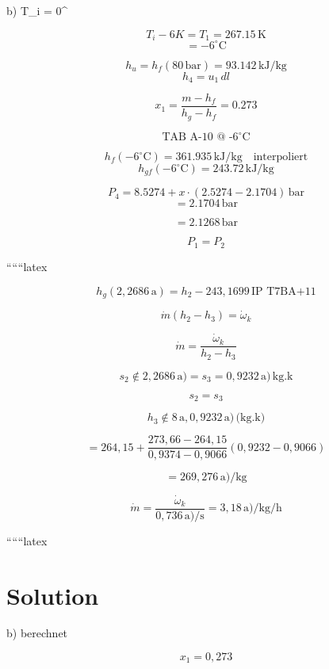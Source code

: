 b) \quad T_i = 0^\circ {}

\[
T_i - 6K = T_1 = 267.15 \, \text{K}
\]
\[
=-6^\circ \text{C}
\]

\[
h_u = h_f (80 \, \text{bar}) = 93.142 \, \text{kJ/kg}
\]
\[
h_4 = u_1 \, dl
\]

\[
x_1 = \frac{m - h_f}{h_g - h_f} = 0.273
\]

\[
\text{TAB A-10 @ -6}^\circ \text{C}
\]

\[
h_f (-6^\circ \text{C}) = 361.935 \, \text{kJ/kg} \quad \text{interpoliert}
\]
\[
h_{gf} (-6^\circ \text{C}) = 243.72 \, \text{kJ/kg}
\]

\[
P_4 = 8.5274 + x \cdot (2.5274 - 2.1704) \, \text{bar}
\]
\[
= 2.1704 \, \text{bar}
\]

\[
= 2.1268 \, \text{bar}
\]

\[
P_1 = P_2
\]

``````latex

\[
h_g(2,2686 \, \text{a}) = h_2 - 243,1699 \, \text{IP T7BA+11}
\]

\[
\dot{m}(h_2 - h_3) = \dot{\omega}_k
\]

\[
\dot{m} = \frac{\dot{\omega}_k}{h_2 - h_3}
\]

\[
s_2 \not\in 2,2686 \, \text{a}) = s_3 = 0,9232 \, \text{a}) \, \text{kg.k}
\]

\[
s_2 = s_3
\]

\[
h_3 \not\in 8 \, \text{a}, 0,9232 \, \text{a}) \, \text{(kg.k)}
\]

\[
= 264,15 + \frac{273,66 - 264,15}{0,9374 - 0,9066} (0,9232 - 0,9066)
\]

\[
= 269,276 \, \text{a})/\text{kg}
\]

\[
\dot{m} = \frac{\dot{\omega}_k}{0,736 \, \text{a})/\text{s}} = 3,18 \, \text{a})/\text{kg/h}
\]

``````latex

\section*{Solution}

b) berechnet

\[
x_1 = 0{,}273
\]